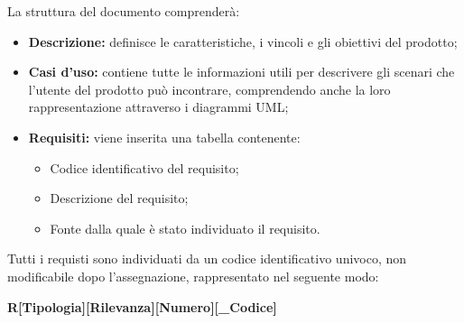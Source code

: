 La struttura del documento comprenderà:
\begin{itemize}
	\item \textbf{Descrizione:} definisce le caratteristiche, i vincoli e gli obiettivi del prodotto;
	\item \textbf{Casi d'uso:} contiene tutte le informazioni utili per descrivere gli scenari che l'utente del prodotto può incontrare, comprendendo anche la loro rappresentazione attraverso i diagrammi UML;
	\item \textbf{Requisiti:} viene inserita una tabella contenente:
	\begin{itemize}
		\item Codice identificativo del requisito;
		\item Descrizione del requisito;
		\item Fonte dalla quale è stato individuato il requisito. 
	\end{itemize} 
\end{itemize}

\label{ClassificazioneRequisiti}Tutti i requisti sono individuati da un codice identificativo univoco, non modificabile dopo l'assegnazione, rappresentato nel seguente modo:

\begin{center}
	\textbf{R[Tipologia][Rilevanza][Numero][\_Codice]}
\end{center}

